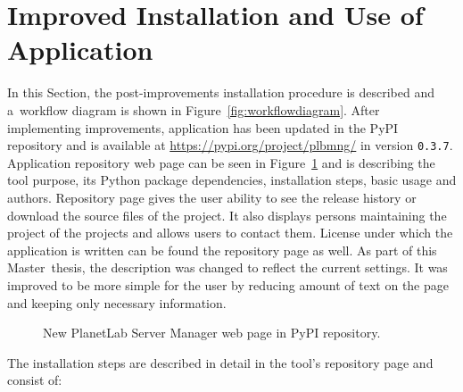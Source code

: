 {{{{{{{\section{Improved Installation and Use of Application}
\label{section:currentapp}
In this Section, the post-improvements installation procedure is described and a~workflow diagram is shown in Figure~\ref{fig:workflowdiagram}. After implementing improvements, application has been updated in the PyPI repository and is available at \url{https://pypi.org/project/plbmng/} in version \texttt{0.3.7}. Application repository web page can be seen in Figure~\ref{fig:plbmngrepo} and is describing the tool purpose, its Python package dependencies, installation steps, basic usage and authors. Repository page gives the user ability to see the release history or download the source files of the project. It also displays persons maintaining the project of the projects and allows users to contact them. License under which the application is written can be found the repository page as well. As part of this Master~thesis, the description was changed to reflect the current settings. It was improved to be more simple for the user by reducing amount of text on the page and keeping only necessary information.

\begin{figure}[H]
	\centering
	\caption{New PlanetLab Server Manager web page in PyPI repository.}
	\label{fig:plbmngrepo}
\end{figure}

The installation steps are described in detail in the tool's repository page and consist of:

}}}}}}}
